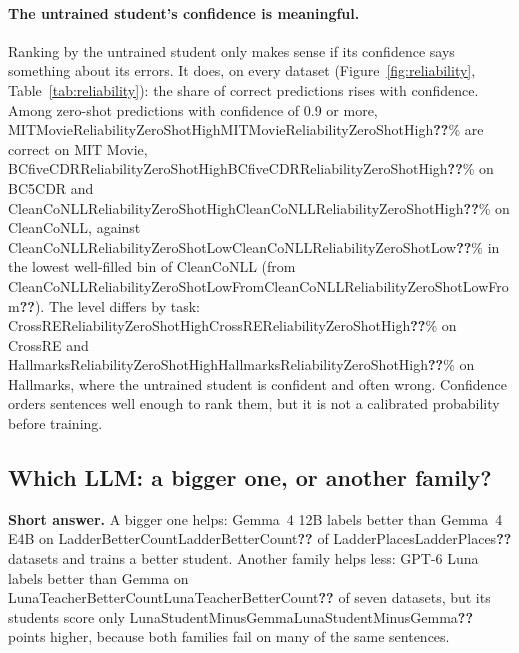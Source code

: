 \documentclass[11pt]{article}
\newcommand{\res}[1]{\ifcsname #1\endcsname\csname #1\endcsname\else\textbf{??}\fi}
\newcommand{\answer}[1]{\noindent\textbf{Short answer.} #1\par\medskip}
\begin{document}
\paragraph{The untrained student's confidence is meaningful.} Ranking by the untrained student only makes sense if its confidence says something about its errors. It does, on every dataset (Figure~\ref{fig:reliability}, Table~\ref{tab:reliability}): the share of correct predictions rises with confidence. Among zero-shot predictions with confidence of 0.9 or more, \res{MITMovieReliabilityZeroShotHigh}\% are correct on MIT Movie, \res{BCfiveCDRReliabilityZeroShotHigh}\% on BC5CDR and \res{CleanCoNLLReliabilityZeroShotHigh}\% on CleanCoNLL, against \res{CleanCoNLLReliabilityZeroShotLow}\% in the lowest well-filled bin of CleanCoNLL (from \res{CleanCoNLLReliabilityZeroShotLowFrom}). The level differs by task: \res{CrossREReliabilityZeroShotHigh}\% on CrossRE and \res{HallmarksReliabilityZeroShotHigh}\% on Hallmarks, where the untrained student is confident and often wrong. Confidence orders sentences well enough to rank them, but it is not a calibrated probability before training.

\subsection{Which LLM: a bigger one, or another family?}
\label{sec:teachers}

\answer{A bigger one helps: Gemma~4 12B labels better than Gemma~4 E4B on \res{LadderBetterCount} of \res{LadderPlaces} datasets and trains a better student. Another family helps less: GPT-6 Luna labels better than Gemma on \res{LunaTeacherBetterCount} of seven datasets, but its students score only \res{LunaStudentMinusGemma} points higher, because both families fail on many of the same sentences.}
\end{document}
